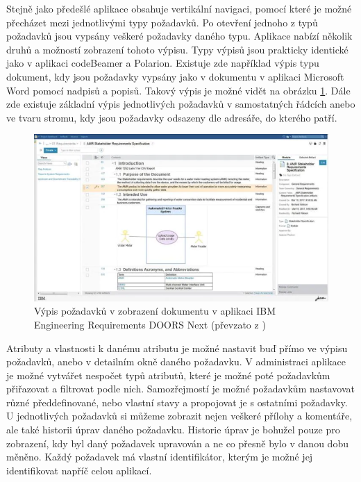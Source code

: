 \documentclass[czech,master,public,dept460,male,cpdeclaration,oneside]{diploma}
\begin{document}
Stejně jako předešlé aplikace obsahuje vertikální navigaci, pomocí které je možné přecházet mezi jednotlivými typy požadavků. Po otevření jednoho z typů požadavků jsou vypsány veškeré požadavky daného typu. Aplikace nabízí několik druhů a možností zobrazení tohoto výpisu. Typy výpisů jsou prakticky identické jako v aplikaci codeBeamer a Polarion. Existuje zde například výpis typu dokument, kdy jsou požadavky vypsány jako v dokumentu v aplikaci Microsoft Word pomocí nadpisů a popisů. Takový výpis je možné vidět na obrázku \ref{fig:ibm_doors_req}. Dále zde existuje základní výpis jednotlivých požadavků v samostatných řádcích anebo ve tvaru stromu, kdy jsou požadavky odsazeny dle adresáře, do kterého patří.

\begin{figure}[!ht]
    \centering
    \includegraphics[width=1\textwidth]{Diplomka/Figures/ibm_doors_ng_req.png}
    \caption{Výpis požadavků v zobrazení dokumentu v aplikaci IBM Engineering Requirements DOORS Next (převzato z \cite{ref:ibm_jazz_erm_dn})}
    \label{fig:ibm_doors_req}
\end{figure}
Atributy a vlastnosti k danému atributu je možné nastavit buď přímo ve výpisu požadavků, anebo v detailním okně daného požadavku. V administraci aplikace je možné vytvářet nespočet typů atributů, které je možné poté požadavkům přiřazovat a filtrovat podle nich. Samozřejmostí je možné požadavkům nastavovat různé předdefinované, nebo vlastní stavy a propojovat je s ostatními požadavky. U jednotlivých požadavků si můžeme zobrazit nejen veškeré přílohy a komentáře, ale také historii úprav daného požadavku. Historie úprav je bohužel pouze pro zobrazení, kdy byl daný požadavek upravován a ne co přesně bylo v danou dobu měněno. Každý požadavek má vlastní identifikátor, kterým je možné jej identifikovat napříč celou aplikací. 
\end{document}
